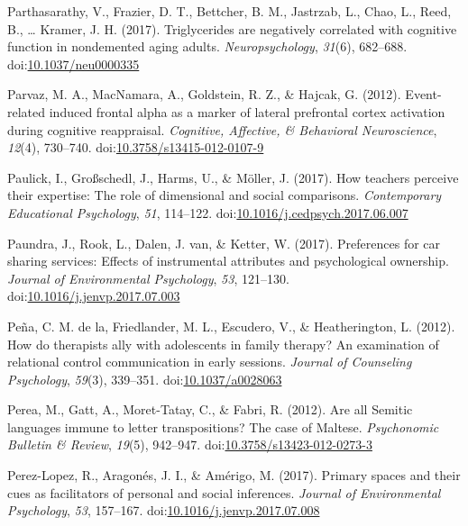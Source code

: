 \documentclass[english,man]{apa6}
\theoremstyle{definition}
\theoremstyle{definition}
\theoremstyle{definition}
\theoremstyle{remark}
\begin{document}
\hypertarget{ref-Parthasarathy2017}{}
Parthasarathy, V., Frazier, D. T., Bettcher, B. M., Jastrzab, L., Chao,
L., Reed, B., \ldots{} Kramer, J. H. (2017). Triglycerides are
negatively correlated with cognitive function in nondemented aging
adults. \emph{Neuropsychology}, \emph{31}(6), 682--688.
doi:\href{https://doi.org/10.1037/neu0000335}{10.1037/neu0000335}

\hypertarget{ref-Parvaz2012}{}
Parvaz, M. A., MacNamara, A., Goldstein, R. Z., \& Hajcak, G. (2012).
Event-related induced frontal alpha as a marker of lateral prefrontal
cortex activation during cognitive reappraisal. \emph{Cognitive,
Affective, \& Behavioral Neuroscience}, \emph{12}(4), 730--740.
doi:\href{https://doi.org/10.3758/s13415-012-0107-9}{10.3758/s13415-012-0107-9}

\hypertarget{ref-Paulick2017}{}
Paulick, I., Großschedl, J., Harms, U., \& Möller, J. (2017). How
teachers perceive their expertise: The role of dimensional and social
comparisons. \emph{Contemporary Educational Psychology}, \emph{51},
114--122.
doi:\href{https://doi.org/10.1016/j.cedpsych.2017.06.007}{10.1016/j.cedpsych.2017.06.007}

\hypertarget{ref-Paundra2017}{}
Paundra, J., Rook, L., Dalen, J. van, \& Ketter, W. (2017). Preferences
for car sharing services: Effects of instrumental attributes and
psychological ownership. \emph{Journal of Environmental Psychology},
\emph{53}, 121--130.
doi:\href{https://doi.org/10.1016/j.jenvp.2017.07.003}{10.1016/j.jenvp.2017.07.003}

\hypertarget{ref-DelaPena2012}{}
Peña, C. M. de la, Friedlander, M. L., Escudero, V., \& Heatherington,
L. (2012). How do therapists ally with adolescents in family therapy? An
examination of relational control communication in early sessions.
\emph{Journal of Counseling Psychology}, \emph{59}(3), 339--351.
doi:\href{https://doi.org/10.1037/a0028063}{10.1037/a0028063}

\hypertarget{ref-Perea2012}{}
Perea, M., Gatt, A., Moret-Tatay, C., \& Fabri, R. (2012). Are all
Semitic languages immune to letter transpositions? The case of Maltese.
\emph{Psychonomic Bulletin \& Review}, \emph{19}(5), 942--947.
doi:\href{https://doi.org/10.3758/s13423-012-0273-3}{10.3758/s13423-012-0273-3}

\hypertarget{ref-Perez-Lopez2017}{}
Perez-Lopez, R., Aragonés, J. I., \& Amérigo, M. (2017). Primary spaces
and their cues as facilitators of personal and social inferences.
\emph{Journal of Environmental Psychology}, \emph{53}, 157--167.
doi:\href{https://doi.org/10.1016/j.jenvp.2017.07.008}{10.1016/j.jenvp.2017.07.008}
\end{document}
